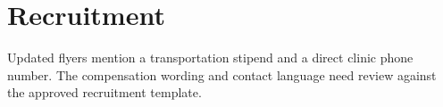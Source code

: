 \documentclass{article}
\begin{document}
        \section{Recruitment}
        Updated flyers mention a transportation stipend and a direct clinic
        phone number. The compensation wording and contact language need review
        against the approved recruitment template.


        
\end{document}
